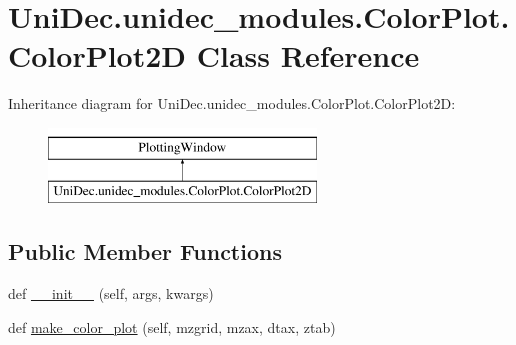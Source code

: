 \hypertarget{class_uni_dec_1_1unidec__modules_1_1_color_plot_1_1_color_plot2_d}{}\section{Uni\+Dec.\+unidec\+\_\+modules.\+Color\+Plot.\+Color\+Plot2\+D Class Reference}
\label{class_uni_dec_1_1unidec__modules_1_1_color_plot_1_1_color_plot2_d}
Inheritance diagram for Uni\+Dec.\+unidec\+\_\+modules.\+Color\+Plot.\+Color\+Plot2\+D\+:\begin{figure}[H]
\begin{center}
\leavevmode
\includegraphics[height=2.000000cm]{class_uni_dec_1_1unidec__modules_1_1_color_plot_1_1_color_plot2_d}
\end{center}
\end{figure}
\subsection*{Public Member Functions}
\begin{DoxyCompactItemize}
\item 
def \hyperlink{class_uni_dec_1_1unidec__modules_1_1_color_plot_1_1_color_plot2_d_aca0a8f7969dcb4fdca4ac0cacc33abb2}{\+\_\+\+\_\+init\+\_\+\+\_\+} (self, args, kwargs)
\item 
def \hyperlink{class_uni_dec_1_1unidec__modules_1_1_color_plot_1_1_color_plot2_d_a5650481cecdb043b51ac4b480e9e76df}{make\+\_\+color\+\_\+plot} (self, mzgrid, mzax, dtax, ztab)
\end{DoxyCompactItemize}
